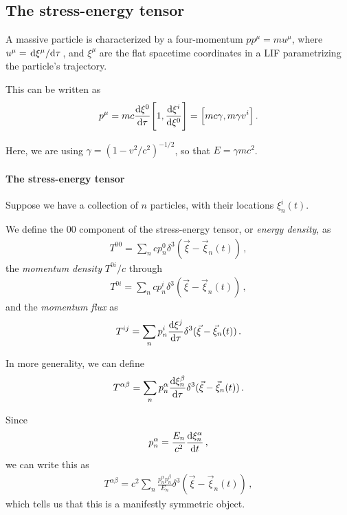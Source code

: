 \documentclass[main.tex]{subfiles}
\begin{document}
\subsection{The stress-energy tensor}


A massive particle is characterized by a four-momentum \(pp^{\mu } = m u^{\mu }\), where \(u^{\mu } = \dv*{\xi^{\mu }}{\tau }\), and \(\xi^{\mu }\) are the flat spacetime coordinates in a LIF parametrizing the particle's trajectory. 

This can be written as 
%
\begin{align}
p^{\mu } = mc \dv{\xi^{0}}{\tau } \qty[1, \dv{\xi^{i}}{\xi^{0}}] = \qty[mc \gamma , m \gamma v^{i}]
\,.
\end{align}

Here, we are using \(\gamma = (1 - v^2 / c^2)^{-1/2}\), so that \(E = \gamma m c^2\). 

\paragraph{The stress-energy tensor}

Suppose we have a collection of \(n\) particles, with their locations \(\xi^{i} _n (t)\). 

We define the 00 component of the stress-energy tensor, or \emph{energy density}, as
%
\begin{align}
T^{00}  = \sum _{n} c p^{0}_n
\delta^3 (\vec{\xi} - \vec{\xi}_n (t))
\,,
\end{align}
%
the \emph{momentum density} \(T^{0i} / c\) through 
%
\begin{align}
T^{0i} = \sum _{n } c p^{i}_n \delta^3 (\vec{\xi} - \vec{\xi}_n (t))
\,,
\end{align}
%
and the \emph{momentum flux} as
%
\begin{align}
T^{ij} = \sum _{n} p^{i}_n \dv{\xi^{j}}{\tau } \delta^3 (\vec{\xi } - \vec{\xi}_n (t))
\,.
\end{align}

In more generality, we can define 
%
\begin{align}
T^{\alpha \beta } = \sum _{n} p^{\alpha }_{n} \dv{\xi^{\beta }_n}{\tau } \delta^3 (\vec{\xi} - \vec{\xi}_n(t))
\,.
\end{align}

Since 
%
\begin{align}
p_n^\alpha = \frac{E_n}{c^2} \dv{\xi^{\alpha }_n}{t}
\,,
\end{align}
%
we can write this as 
%
\begin{align}
T^{\alpha \beta } = c^2 \sum _{n} \frac{p_n^\alpha p_n^\beta }{E_n} \delta^3(\vec{\xi} - \vec{\xi}_n(t))
\,,
\end{align}
%
which tells us that this is a manifestly symmetric object. 
\end{document}
